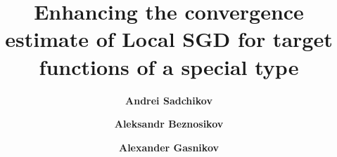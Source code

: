 
\title{\fontsize{12}{14}\selectfont \textbf{Enhancing the convergence estimate of Local SGD for target functions of a special type}}

\author[1]{\fontsize{11}{14} \textbf{Andrei Sadchikov}}
\author[1, 2]{\fontsize{11}{14} \textbf{Aleksandr Beznosikov}}
\author[1, 3]{\fontsize{11}{14} \textbf{Alexander Gasnikov}}

\date{}